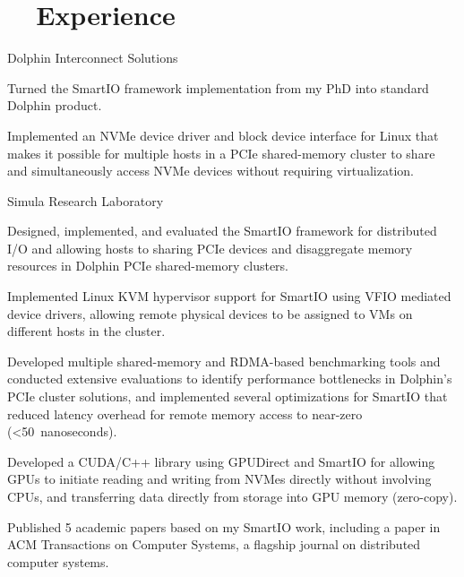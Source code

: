 \section[Experience]{\faBriefcase~~Experience}
\begin{experience}{Dolphin Interconnect Solutions}{
}
    \item{Turned the SmartIO framework implementation from my PhD into standard Dolphin product.}
    \item{Implemented an NVMe device driver and block device interface for Linux that makes it possible for multiple hosts in a PCIe shared-memory cluster to share and simultaneously access NVMe devices without requiring virtualization.}
\end{experience}

\begin{experience}{Simula Research Laboratory}{
}
    \item{Designed, implemented, and evaluated the SmartIO framework for distributed I/O and allowing hosts to sharing PCIe devices and disaggregate memory resources in Dolphin PCIe shared-memory clusters.}
    \item{Implemented Linux KVM hypervisor support for SmartIO using VFIO mediated device drivers, allowing remote physical devices to be assigned to VMs on different hosts in the cluster.}
    \item{Developed multiple shared-memory and RDMA-based benchmarking tools and conducted extensive evaluations to identify performance bottlenecks in Dolphin's PCIe cluster solutions, and implemented several optimizations for SmartIO that reduced latency overhead for remote memory access to near-zero (\textless 50~nanoseconds).}
    \item{Developed a CUDA/C++ library using GPUDirect and SmartIO for allowing GPUs to initiate reading and writing from NVMes directly without involving CPUs, and transferring data directly from storage into GPU memory (zero-copy).}
    \item{Published 5 academic papers based on my SmartIO work, including a paper in ACM Transactions on Computer Systems, a flagship journal on distributed computer systems.}
\end{experience}

